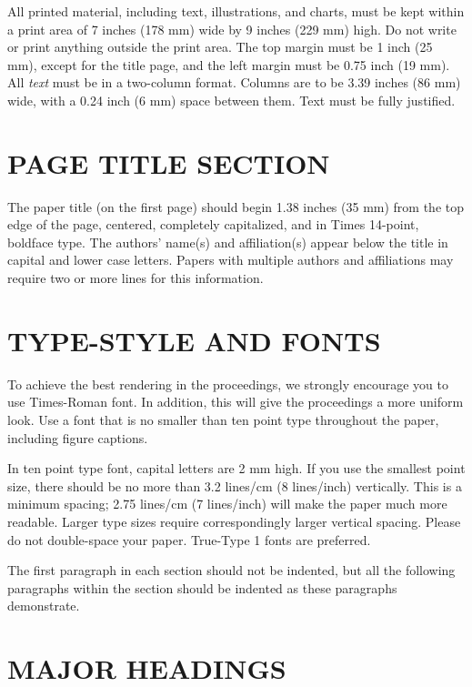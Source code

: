 \documentclass{article}
\begin{document}
All printed material, including text, illustrations, and charts, must be kept
within a print area of 7 inches (178 mm) wide by 9 inches (229 mm) high. Do
not write or print anything outside the print area. The top margin must be 1
inch (25 mm), except for the title page, and the left margin must be 0.75 inch
(19 mm).  All {\it text} must be in a two-column format. Columns are to be 3.39
inches (86 mm) wide, with a 0.24 inch (6 mm) space between them. Text must be
fully justified.

\section{PAGE TITLE SECTION}
\label{sec:pagestyle}

The paper title (on the first page) should begin 1.38 inches (35 mm) from the
top edge of the page, centered, completely capitalized, and in Times 14-point,
boldface type.  The authors' name(s) and affiliation(s) appear below the title
in capital and lower case letters.  Papers with multiple authors and
affiliations may require two or more lines for this information.

\section{TYPE-STYLE AND FONTS}
\label{sec:typestyle}

To achieve the best rendering in the proceedings, we
strongly encourage you to use Times-Roman font.  In addition, this will give
the proceedings a more uniform look.  Use a font that is no smaller than ten
point type throughout the paper, including figure captions.

In ten point type font, capital letters are 2 mm high.  If you use the
smallest point size, there should be no more than 3.2 lines/cm (8 lines/inch)
vertically.  This is a minimum spacing; 2.75 lines/cm (7 lines/inch) will make
the paper much more readable.  Larger type sizes require correspondingly larger
vertical spacing.  Please do not double-space your paper.  True-Type 1 fonts
are preferred.

The first paragraph in each section should not be indented, but all the
following paragraphs within the section should be indented as these paragraphs
demonstrate.

\section{MAJOR HEADINGS}
\label{sec:majhead}
\end{document}

